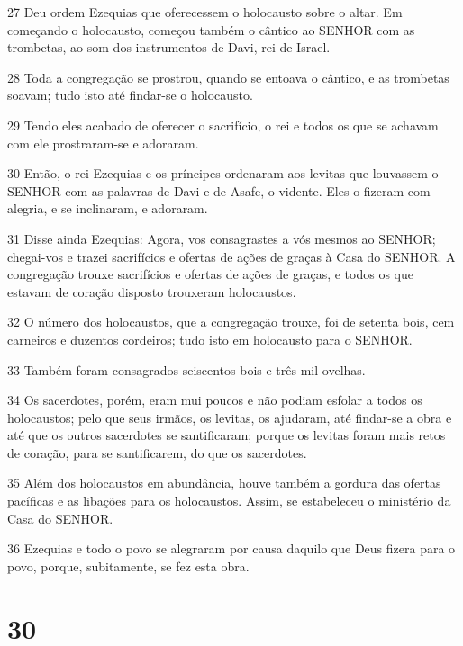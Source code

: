 \par 27 Deu ordem Ezequias que oferecessem o holocausto sobre o altar. Em começando o holocausto, começou também o cântico ao SENHOR com as trombetas, ao som dos instrumentos de Davi, rei de Israel.
\par 28 Toda a congregação se prostrou, quando se entoava o cântico, e as trombetas soavam; tudo isto até findar-se o holocausto.
\par 29 Tendo eles acabado de oferecer o sacrifício, o rei e todos os que se achavam com ele prostraram-se e adoraram.
\par 30 Então, o rei Ezequias e os príncipes ordenaram aos levitas que louvassem o SENHOR com as palavras de Davi e de Asafe, o vidente. Eles o fizeram com alegria, e se inclinaram, e adoraram.
\par 31 Disse ainda Ezequias: Agora, vos consagrastes a vós mesmos ao SENHOR; chegai-vos e trazei sacrifícios e ofertas de ações de graças à Casa do SENHOR. A congregação trouxe sacrifícios e ofertas de ações de graças, e todos os que estavam de coração disposto trouxeram holocaustos.
\par 32 O número dos holocaustos, que a congregação trouxe, foi de setenta bois, cem carneiros e duzentos cordeiros; tudo isto em holocausto para o SENHOR.
\par 33 Também foram consagrados seiscentos bois e três mil ovelhas.
\par 34 Os sacerdotes, porém, eram mui poucos e não podiam esfolar a todos os holocaustos; pelo que seus irmãos, os levitas, os ajudaram, até findar-se a obra e até que os outros sacerdotes se santificaram; porque os levitas foram mais retos de coração, para se santificarem, do que os sacerdotes.
\par 35 Além dos holocaustos em abundância, houve também a gordura das ofertas pacíficas e as libações para os holocaustos. Assim, se estabeleceu o ministério da Casa do SENHOR.
\par 36 Ezequias e todo o povo se alegraram por causa daquilo que Deus fizera para o povo, porque, subitamente, se fez esta obra.

\chapter{30}

